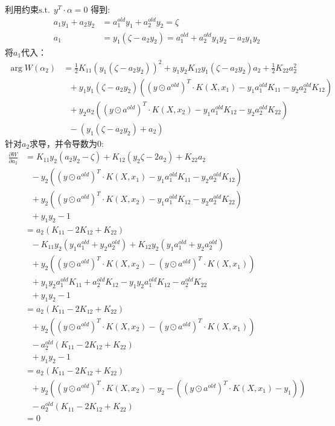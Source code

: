 \documentclass[12pt, a4paper, oneside]{ctexart}
\begin{document}
利用约束$ \mathrm{ s.t. } \ \ y^T \cdot \alpha = 0 $ 得到: 
\begin{align}      
     a_1y_1 + a_2y_2 &= a_1^{old}y_1 + a_2^{old}y_2 = \zeta \nonumber\\
     a_1 &= y_1( \zeta - a_2y_2) =  a_1^{old} + a_2^{old}y_1y_2 - a_2y_1y_2 \nonumber
\end{align}
将$a_1$代入：
\begin{align}      
    \mathop{\arg\min_{\alpha_2}}  W(\alpha_2) &=  \frac{1}{2}K_{11}(y_1( \zeta - a_2y_2))^2 + y_1y_2K_{12}y_1( \zeta - a_2y_2)a_2  + \frac{1}{2}K_{22}a_2^2 \nonumber \\
        & \ \ \ + y_1y_1( \zeta - a_2y_2)((y \odot a^{old})^T \cdot K(X, x_1) - y_1a_1^{old}K_{11} - y_2a_2^{old}K_{12} ) \nonumber \\
        & \ \ \ + y_2a_2((y \odot a^{old})^T \cdot K(X, x_2) - y_1a_1^{old}K_{12} - y_2a_2^{old}K_{22} ) \nonumber \\
        & \ \ \ - (y_1( \zeta - a_2y_2) + a_2) \nonumber 
\end{align}
针对$a_2$求导，并令导数为0:
\begin{align}
    \frac{\partial W}{\partial a_2} &= K_{11}y_2( a_2y_2 - \zeta) + K_{12}(y_2\zeta - 2a_2) + K_{22}a_2 \nonumber \\
    & \ \ \ - y_2((y \odot a^{old})^T \cdot K(X, x_1) - y_1a_1^{old}K_{11} - y_2a_2^{old}K_{12} ) \nonumber \\
    & \ \ \ + y_2((y \odot a^{old})^T \cdot K(X, x_2) - y_1a_1^{old}K_{12} - y_2a_2^{old}K_{22} ) \nonumber \\
    & \ \ \ + y_1y_2 - 1 \nonumber \\
    &= a_2(K_{11} - 2K_{12} + K_{22}) \nonumber \\
    & \ \ \ - K_{11}y_2(y_1a_1^{old} + y_2a_2^{old}) + K_{12}y_2(y_1a_1^{old} + y_2a_2^{old}) \nonumber \\
    & \ \ \ + y_2((y \odot a^{old})^T \cdot K(X, x_2) - (y \odot a^{old})^T \cdot K(X, x_1) ) \nonumber \\
    & \ \ \ + y_1y_2a_1^{old}K_{11} + a_2^{old}K_{12} - y_1y_2a_1^{old}K_{12} - a_2^{old}K_{22} \nonumber \\
    & \ \ \ + y_1y_2 - 1 \nonumber \\
    &= a_2(K_{11} - 2K_{12} + K_{22}) \nonumber \\
    & \ \ \ + y_2((y \odot a^{old})^T \cdot K(X, x_2) - (y \odot a^{old})^T \cdot K(X, x_1) ) \nonumber \\
    & \ \ \ - a_2^{old}(K_{11} - 2K_{12} + K_{22}) \nonumber \\
    & \ \ \ + y_1y_2 - 1 \nonumber \\
    &= a_2(K_{11} - 2K_{12} + K_{22}) \nonumber \\
    & \ \ \ + y_2((y \odot a^{old})^T \cdot K(X, x_2) - y_2 - ((y \odot a^{old})^T \cdot K(X, x_1) - y_1)) \nonumber \\
    & \ \ \ - a_2^{old}(K_{11} - 2K_{12} + K_{22}) \nonumber \\
    &= 0 \nonumber
\end{align}
\end{document}
